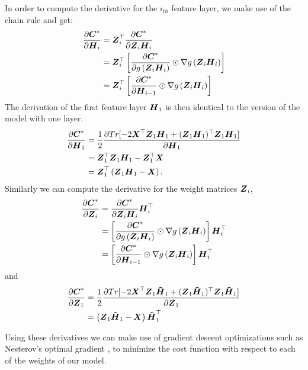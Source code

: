 \documentclass[10pt,journal,compsoc]{IEEEtran}
\begin{document}
In order to compute the derivative for the $i_{th}$ feature layer, we make use of the chain rule and get:
\begin{align*}
\dfrac{\partial\boldsymbol{C}^*}{\partial \boldsymbol H_i} &= \boldsymbol{Z}^{\top}_i \dfrac{\partial\boldsymbol{C}^*}{\partial {\boldsymbol Z_i \boldsymbol H_i}}\\
 &= \boldsymbol{Z}^{\top}_i \left[\dfrac{\partial\boldsymbol{C}^*}{\partial g\left({\boldsymbol Z_i \boldsymbol H_i}\right)} \odot \nabla g\left({\boldsymbol Z_i \boldsymbol H_i}\right)\right]\\
 &= \boldsymbol{Z}^{\top}_i \left[\dfrac{\partial\boldsymbol{C}^*}{\partial \boldsymbol{H}_{i-1}} \odot \nabla g\left({\boldsymbol Z_i \boldsymbol H_i}\right)\right]
\end{align*}
The derivation of the first feature layer $\boldsymbol{H}_1$ is then identical to the version of the model with one layer. 
\begin{align*}
\dfrac{\partial\boldsymbol{C}^*}{\partial \boldsymbol H_1} &= \frac{1}{2} \dfrac{\partial  Tr[-2 \boldsymbol{X}^{\top}\boldsymbol Z_1 \boldsymbol{H}_1 + (\boldsymbol Z_1 \boldsymbol{H}_1)^{\top} \boldsymbol Z_1 \boldsymbol{H}_1]}{\partial \boldsymbol H_1} \\
& = \boldsymbol{Z}_1^{\top} \boldsymbol{Z}_1 \boldsymbol{H}_1 - \boldsymbol{Z}_1^{\top} \boldsymbol{X}\\
& = \boldsymbol{Z}_1^{\top} \left(\boldsymbol{Z}_1 \boldsymbol{H}_1  - \boldsymbol{X} \right).
\end{align*}
Similarly we can compute the derivative for the weight matrices $\boldsymbol{Z}_i$, 
\begin{align*}
\dfrac{\partial\boldsymbol{C}^*}{\partial \boldsymbol Z_i} &= \dfrac{\partial\boldsymbol{C}^*}{\partial {\boldsymbol Z_i \boldsymbol{ H}_i}} \boldsymbol{ H}^{\top}_i \\
 &= \left[\dfrac{\partial\boldsymbol{C}^*}{\partial g\left({\boldsymbol Z_i \boldsymbol{ H}_i}\right)} \odot \nabla g\left({\boldsymbol Z_i \boldsymbol{ H}_i}\right)\right] \boldsymbol{ H}^{\top}_i \\
 &= \left[\dfrac{\partial\boldsymbol{C}^*}{\partial \boldsymbol{H}_{i-1}} \odot \nabla g\left({\boldsymbol Z_i \boldsymbol{ H}_i}\right)\right] \boldsymbol{ H}^{\top}_i
\end{align*}
and
\begin{align*}
\dfrac{\partial\boldsymbol{C}^*}{\partial \boldsymbol Z_1} &= \frac{1}{2} \dfrac{\partial  Tr[-2 \boldsymbol{X}^{\top}\boldsymbol Z_1 \boldsymbol{\tilde{H}}_1 + (\boldsymbol Z_1 \boldsymbol{\tilde{H}}_1)^{\top} \boldsymbol Z_1 \boldsymbol{\tilde H}_1]}{\partial \boldsymbol Z_1} \\
& =   \left(\boldsymbol{Z}_1 \boldsymbol{\tilde{H}}_1 - \boldsymbol{X}\right) \boldsymbol{\tilde{H}}_1^\top
\end{align*}

Using these derivatives we can make use of gradient descent optimizations such as Nesterov's optimal gradient \cite{nesterov2007gradient}, to minimize the cost function with respect to each of the weights of our model.
\end{document}
